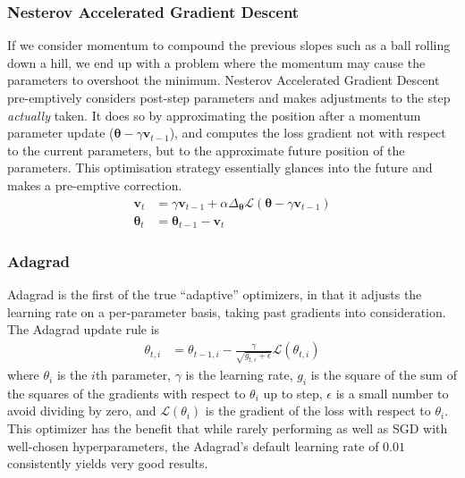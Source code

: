 \documentclass{report}
\begin{document}
	\subsubsection{Nesterov Accelerated Gradient Descent}
	If we consider momentum to compound the previous slopes such as a ball rolling down a hill, we end up with a problem where the momentum may cause the parameters to overshoot the minimum. Nesterov Accelerated Gradient Descent \parencite{nesterov} pre-emptively considers post-step parameters and makes adjustments to the step \textit{actually} taken. It does so by approximating the position after a momentum parameter update ($\bm{\theta} - \gamma\bm{v}_{t-1}$), and computes the loss gradient not with respect to the current parameters, but to the approximate future position of the parameters. This optimisation strategy essentially glances into the future and makes a pre-emptive correction.
	\begin{align}
		\bm{v}_t &= \gamma \bm{v}_{t-1} + \alpha \Delta_{\bm{\theta}} \mathcal{L}(\bm{\theta} - \gamma\bm{v}_{t-1}) \\
		\bm{\theta}_t &= \bm{\theta}_{t-1} - \bm{v}_t
	\end{align}
	
	\subsubsection{Adagrad}
	Adagrad \parencite{adagrad} is the first of the true ``adaptive'' optimizers, in that it adjusts the learning rate on a per-parameter basis, taking past gradients into consideration. The Adagrad update rule is
	\begin{align} \label{adagrad:1}
		\theta_{t, i} &= \theta_{t-1, i} - \frac{\gamma}{\sqrt{g_{t, i} + \epsilon}} \mathcal{L}(\theta_{t, i})
	\end{align}
	where $\theta_i$ is the $i$th parameter, $\gamma$ is the learning rate, $g_i$ is the square of the sum of the squares of the gradients with respect to $\theta_i$ up to step, $\epsilon$ is a small number to avoid dividing by zero, and $\mathcal{L}(\theta_i)$ is the gradient of the loss with respect to $\theta_i$. This optimizer has the benefit that while rarely performing as well as SGD with well-chosen hyperparameters, the Adagrad's default learning rate of $0.01$ consistently yields very good results.
	
\end{document}
